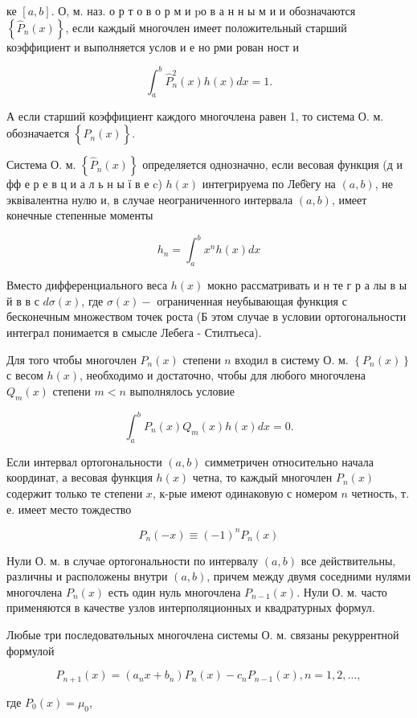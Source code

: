 \documentclass[10pt]{article}
\begin{document}
ке $[a, b]$. О, м. наз. о р т о в о р м и $\mathrm{p} о$ в а н н ы м и и обозначаются $\left\{\hat{P}_{n}(x)\right\}$, если каждый многочлен имеет положительный старший коэффициент и выполняется услов и е но рми рован ност и

\[
\int_{a}^{b} \hat{P}_{n}^{2}(x) h(x) d x=1 .
\]

А если старший коэффициент каждого многочлена равен 1, то система О. м. обозначается $\left\{\hat{P}_{n}(x)\right\}$.

Система О. м. $\left\{\hat{P}_{n}(x)\right\}$ определяется однозначно, если весовая функция (д и фф е р е в ц и а л ь н ы ї в е c) $h(x)$ интегрируема по Леб̈егу на $(a, b)$, не эквівалентна нулю и, в случае неограниченного интервала $(a, b)$, имеет конечные степенные моменты

\[
h_{n}=\int_{a}^{b} x^{n} h(x) d x
\]

Вместо дифференциального веса $h(x)$ мокно рассматривать и н те г р а лы в ы й в в с $d \sigma(x)$, где $\sigma(x)-$ ограниченная неубывающая функция с бесконечным множеством точек роста (Б этом случае в условии ортогональности интеграл понимается в смысле Лебега - Стилтьеса).

Для того чтобы многочлен $P_{n}(x)$ степени $n$ входил в систему О. м. $\left\{P_{n}(x)\right\}$ с весом $h(x)$, необходимо и достаточно, чтобы для любого многочлена $Q_{m}(x)$ степени $m<n$ выполнялось условие

\[
\int_{a}^{b} P_{n}(x) Q_{m}(x) h(x) d x=0 .
\]

Если интервал ортогональности $(a, b)$ симметричен относительно начала координат, а весовая функция $h(x)$ четна, то каждый многочлен $P_{n}(x)$ содержит только те степени $x$, к-рые имеют одинаковую с номером $n$ четность, т. е. имеет место тождество

\[
P_{n}(-x) \equiv(-1)^{n} P_{n}(x)
\]

Нули О. м. в случае ортогональности по интервалу $(a, b)$ все действительны, различны и расположены внутри $(a, b)$, причем между двумя соседними нулями многочлена $P_{n}(x)$ есть один нуль многочлена $P_{n-1}(x)$. Нули О. м. часто применяются в качестве узлов интерполяционных и квадратурных формул.

Любые три последоватөльных многочлена системы О. м. связаны рекуррентной формулой

\[
P_{n+1}(x)=\left(a_{n} x+b_{n}\right) P_{n}(x)-c_{n} P_{n-1}(x), n=1,2, \ldots,
\]

где $P_{0}(x)=\mu_{0}$,
\end{document}
